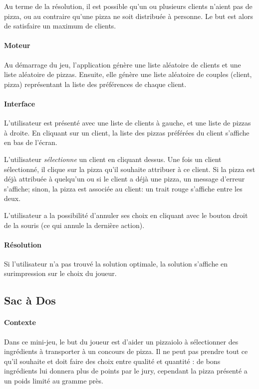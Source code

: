 			Au terme de la résolution, il est possible qu'un ou plusieurs clients n'aient pas
			 de pizza, ou au contraire qu'une pizza ne soit distribuée à personne. Le but est
			 alors de satisfaire un maximum de clients.
		\paragraph{Moteur}
			Au démarrage du jeu, l'application génère une liste aléatoire de clients et une
			 liste aléatoire de pizzas. Ensuite, elle génère une liste aléatoire de couples
			 (client, pizza) représentant la liste des préférences de chaque client.
		\paragraph{Interface}
			L'utilisateur est présenté avec une liste de clients à gauche, et une liste
			 de pizzas à droite. En cliquant sur un client, la liste des pizzas préférées
			 du client s'affiche en bas de l'écran.

			L'utilisateur \emph{sélectionne} un client en cliquant dessus. Une fois un client
			 sélectionné, il clique sur la pizza qu'il souhaite attribuer à ce client. Si la
			 pizza est déjà attribuée à quelqu'un ou si le client a déjà une pizza, un message
			 d'erreur s'affiche; sinon, la pizza est associée au client: un trait rouge
			 s'affiche entre les deux.

			L'utilisateur a la possibilité d'annuler ses choix en cliquant avec le bouton
			 droit de la souris (ce qui annule la dernière action).
		\paragraph{Résolution}
			Si l'utilisateur n'a pas trouvé la solution optimale, la solution s'affiche
			 en surimpression sur le choix du joueur.

    \subsection{Sac à Dos}
        \paragraph{Contexte}
            Dans ce mini-jeu, le but du joueur est d'aider un pizzaiolo à
            sélectionner des ingrédients à transporter à un concours de pizza.
            Il ne peut pas prendre tout ce qu'il souhaite et doit faire des
            choix entre qualité et quantité : de bons ingrédients lui donnera
            plus de points par le jury, cependant la pizza présenté a un poids
            limité au gramme près.

